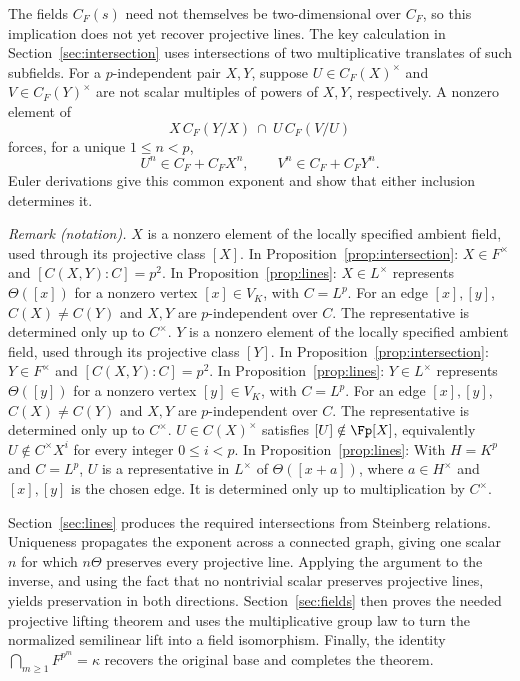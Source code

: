The fields $C_F(s)$ need not themselves be two-dimensional over $C_F$,
so this implication does not yet recover projective lines. The key
calculation in Section~\ref{sec:intersection} uses intersections of
two multiplicative translates of such subfields. For a $p$-independent
pair $X,Y$, suppose $U\in C_F(X)^\times$ and
$V\in C_F(Y)^\times$ are not scalar multiples of powers of $X,Y$,
respectively. A nonzero element of
\[
             X\,C_F(Y/X)\ \cap\ U\,C_F(V/U)
\]
forces, for a unique $1\le n<p$,
\[
                    U^n\in C_F+C_FX^n,
                    \qquad V^n\in C_F+C_FY^n.
\]
Euler derivations give this common exponent and show that either
inclusion determines it.

\noindent\textit{Remark (notation).} $X$ is a nonzero element of the locally specified ambient field, used through its projective class $[X]$. In Proposition~\ref{prop:intersection}: $X\in F^\times$ and $[C(X,Y):C]=p^2$. In Proposition~\ref{prop:lines}: $X\in L^\times$ represents $\Theta([x])$ for a nonzero vertex $[x]\in V_K$, with $C=L^p$. For an edge $[x],[y]$, $C(X)\ne C(Y)$ and $X,Y$ are $p$-independent over $C$. The representative is determined only up to $C^\times$. $Y$ is a nonzero element of the locally specified ambient field, used through its projective class $[Y]$. In Proposition~\ref{prop:intersection}: $Y\in F^\times$ and $[C(X,Y):C]=p^2$. In Proposition~\ref{prop:lines}: $Y\in L^\times$ represents $\Theta([y])$ for a nonzero vertex $[y]\in V_K$, with $C=L^p$. For an edge $[x],[y]$, $C(X)\ne C(Y)$ and $X,Y$ are $p$-independent over $C$. The representative is determined only up to $C^\times$. $U\in C(X)^\times$ satisfies $[U]\notin\Fp[X]$, equivalently $U\notin C^\times X^i$ for every integer $0\le i<p$. In Proposition~\ref{prop:lines}: With $H=K^p$ and $C=L^p$, $U$ is a representative in $L^\times$ of $\Theta([x+a])$, where $a\in H^\times$ and $[x],[y]$ is the chosen edge. It is determined only up to multiplication by $C^\times$.


Section~\ref{sec:lines} produces the required intersections from
Steinberg relations. Uniqueness propagates the exponent across a
connected graph, giving one scalar $n$ for which $n\Theta$ preserves
every projective line. Applying the argument to the inverse, and using
the fact that no nontrivial scalar preserves projective lines, yields
preservation in both directions. Section~\ref{sec:fields} then proves
the needed projective lifting theorem and uses the multiplicative group
law to turn the normalized semilinear lift into a field isomorphism.
Finally, the identity
$\bigcap_{m\ge1}F^{p^m}=\kappa$ recovers the original base and
completes the theorem.


